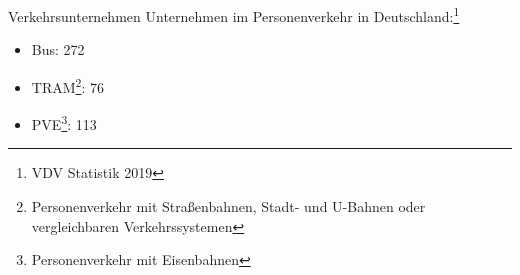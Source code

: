 
\begin{frame}{Verkehrsunternehmen}
  Unternehmen im Personenverkehr in Deutschland:\footnote{VDV Statistik 2019}
  \begin{itemize}
    \item Bus: 272
    \item TRAM\footnote{Personenverkehr mit Straßenbahnen, Stadt- und U-Bahnen oder vergleichbaren Verkehrssystemen}: 76
    \item PVE\footnote{Personenverkehr mit Eisenbahnen}: 113
  \end{itemize}
\end{frame}
